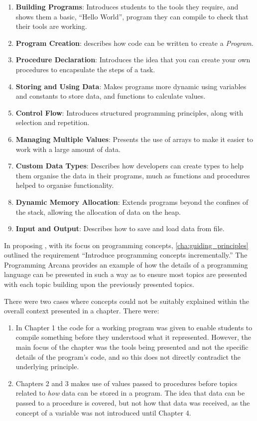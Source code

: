 \begin{enumerate}
  \item \textbf{Building Programs}: Introduces students to the tools they require, and shows them a basic, ``Hello World'', program they can compile to check that their tools are working.
  \item \textbf{Program Creation}: describes how code can be written to create a \emph{Program}.
  \item \textbf{Procedure Declaration}: Introduces the idea that you can create your own procedures to encapsulate the steps of a task. 
  \item \textbf{Storing and Using Data}: Makes programs more dynamic using variables and constants to store data, and functions to calculate values.
  \item \textbf{Control Flow}: Introduces structured programming principles, along with selection and repetition.
  \item \textbf{Managing Multiple Values}: Presents the use of arrays to make it easier to work with a large amount of data.
  \item \textbf{Custom Data Types}: Describes how developers can create types to help them organise the data in their programs, much as functions and procedures helped to organise functionality.
  \item \textbf{Dynamic Memory Allocation}: Extends programs beyond the confines of the stack, allowing the allocation of data on the heap.
  \item \textbf{Input and Output}: Describes how to save and load data from file.
\end{enumerate}

In proposing , with its focus on programming concepts, \cref{cha:guiding_principles} outlined the requirement ``Introduce programming concepts incrementally.'' The Programming Arcana provides an example of how the details of a programming language can be presented in such a way as to ensure most topics are presented with each topic building upon the previously presented topics. 

\clearpage
There were two cases where concepts could not be suitably explained within the overall context presented in a chapter. There were:
\begin{enumerate}
  \item In Chapter 1 the code for a working program was given to enable students to compile something before they understood what it represented. However, the main focus of the chapter was the tools being presented and not the specific details of the program's code, and so this does not directly contradict the underlying principle. 
  \item Chapters 2 and 3 makes use of values passed to procedures before topics related to \emph{how} data can be stored in a program. The idea that data can be passed to a procedure is covered, but not how that data was received, as the concept of a variable was not introduced until Chapter 4.
\end{enumerate}

